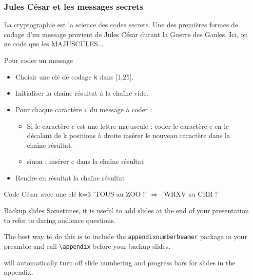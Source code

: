 \documentclass[10pt]{beamer}
\begin{document}
\begin{frame}
  \frametitle{Jules César et les messages secrets}
  La cryptographie est la science des codes secrets.
  Une des premières formes de codage d'un message provient de Jules César durant la Guerre des Gaules.
  Ici, on ne code que les MAJUSCULES...

  \begin{block}{Pour coder un message}
    \begin{itemize}
    \item Choisir une clé de codage \texttt{k} dans [1,25].
    \item Initialiser la chaîne résultat à la chaîne vide.
    \item Pour chaque caractère \texttt{c} du message à coder :
      \begin{itemize}
      \item Si le caractère c est une lettre majuscule : coder le caractère c en le décalant de k positions à droite insérer le nouveau caractère dans la chaîne résultat.
      \item sinon : insérer c dans la chaîne résultat
      \end{itemize}
    \item Rendre en résultat la chaîne résultat

    \end{itemize}
  \end{block}

  \begin{exampleblock}{Code César avec une clé \texttt{k}=3}
    'TOUS au ZOO !'  $\Longrightarrow$ 'WRXV au CRR !'
  \end{exampleblock}
\end{frame}


\questionSlide

 \appendix
 \backupSlides

\begin{frame}[fragile]{Backup slides}
  Sometimes, it is useful to add slides at the end of your presentation to
  refer to during audience questions.

  The best way to do this is to include the \verb|appendixnumberbeamer|
  package in your preamble and call \verb|\appendix| before your backup slides.

  will automatically turn off slide numbering and progress bars for
  slides in the appendix.
\end{frame}







\end{document}

